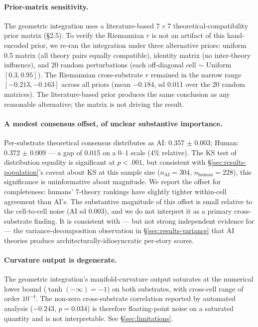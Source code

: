 \documentclass[11pt,a4paper]{article}
\begin{document}
\paragraph{Prior-matrix sensitivity.} The geometric integration uses a literature-based $7 \times 7$ theoretical-compatibility prior matrix (\S2.5). To verify the Riemannian $r$ is not an artifact of this hand-encoded prior, we re-ran the integration under three alternative priors: uniform 0.5 matrix (all theory pairs equally compatible), identity matrix (no inter-theory influence), and 20 random perturbations (each off-diagonal cell $\sim$ Uniform$[0.3, 0.95]$). The Riemannian cross-substrate $r$ remained in the narrow range $[-0.213, -0.163]$ across all priors (mean $-0.184$, sd 0.011 over the 20 random matrices). The literature-based prior produces the same conclusion as any reasonable alternative; the matrix is not driving the result.

\paragraph{A modest consensus offset, of unclear substantive importance.} Per-substrate theoretical consensus distributes as AI: 0.357 $\pm$ 0.003; Human: 0.372 $\pm$ 0.009 --- a gap of 0.015 on a 0--1 scale (4\% relative). The KS test of distribution equality is significant at $p < .001$, but consistent with \S\ref{sec:results-population}'s caveat about KS at this sample size ($n_{\mathrm{AI}} = 304$, $n_{\mathrm{human}} = 228$), this significance is uninformative about magnitude. We report the offset for completeness: humans' 7-theory rankings have slightly tighter within-cell agreement than AI's. The substantive magnitude of this offset is small relative to the cell-to-cell noise (AI sd 0.003), and we do not interpret it as a primary cross-substrate finding. It is consistent with --- but not strong independent evidence for --- the variance-decomposition observation in \S\ref{sec:results-variance} that AI theories produce architecturally-idiosyncratic per-story scores.

\paragraph{Curvature output is degenerate.} The geometric integration's manifold-curvature output saturates at the numerical lower bound ($\tanh(-\infty) = -1$) on both substrates, with cross-cell range of order $10^{-4}$. The non-zero cross-substrate correlation reported by automated analysis ($-0.243$, $p = 0.034$) is therefore floating-point noise on a saturated quantity and is not interpretable. See \S\ref{sec:limitations}.
\end{document}
